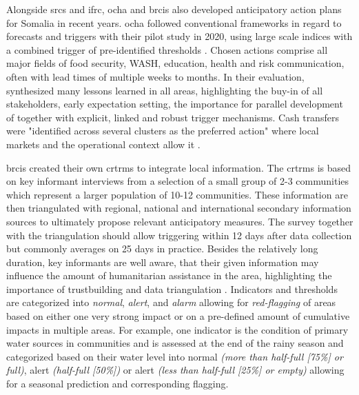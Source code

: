 Alongside \acrshort{srcs} and \acrshort{ifrc}, \acrshort{ocha} and \acrshort{brcis} also developed anticipatory action plans for Somalia in recent years. \acrshort{ocha} followed conventional frameworks in regard to forecasts and triggers with their pilot study in 2020, using large scale indices with a combined trigger of pre-identified thresholds \autocite{gettliffeOCHAAnticipatoryAction2021,ochaANTICIPATORYACTIONPLAN2020}. Chosen actions comprise all major fields of food security, WASH, education, health and risk communication, often with lead times of multiple weeks to months. In their evaluation, \textcite{gettliffeOCHAAnticipatoryAction2021} synthesized many lessons learned in all areas, highlighting the buy-in of all stakeholders, early expectation setting, the importance for parallel development of  together with explicit, linked and robust trigger mechanisms. Cash transfers were "identified across several clusters as the preferred action" \autocite[21]{ochaANTICIPATORYACTIONPLAN2020} where local markets and the operational context allow it \autocites{gettliffeOCHAAnticipatoryAction2021}.

\acrshort{brcis} created their own \acrfull{crtrms} to integrate local information. The \acrshort{crtrms} is based on key informant interviews from a selection of a small group of 2-3 communities which represent a larger population of 10-12 communities. These information are then triangulated with regional, national and international secondary information sources to ultimately propose relevant anticipatory measures. The survey together with the triangulation should allow triggering within 12 days after data collection but commonly averages on 25 days in practice. Besides the relatively long duration, key informants are well aware, that their given information may influence the amount of humanitarian assistance in the area, highlighting the importance of trustbuilding and data triangulation \autocite{gualazziniEWEAEarlyWarning2021}.\newline
Indicators and thresholds are categorized into \textit{normal}, \textit{alert}, and \textit{alarm} allowing for \textit{red-flagging} of areas based on either one very strong impact or on a pre-defined amount of cumulative impacts in multiple areas. For example, one indicator is the condition of primary water sources in communities and is assessed at the end of the rainy season and categorized based on their water level into normal \textit{(more than half-full [75\%] or full)}, alert \textit{(half-full [50\%])} or alert \textit{(less than half-full [25\%] or empty)} allowing for a seasonal prediction and corresponding flagging.


